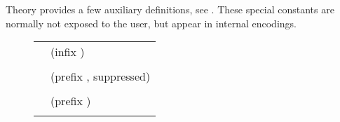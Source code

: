 \begin{isabellebody}
\begin{isamarkuptext}
\begin{description}
  \end{description}%
\end{isamarkuptext}%
\isamarkuptrue%
%
\endisatagmlantiq
{\isafoldmlantiq}%
%
\isadelimmlantiq
%
\endisadelimmlantiq
%
\isamarkuptrue%
%
\begin{isamarkuptext}%
Theory  provides a few auxiliary definitions, see
  .  These special constants are normally not
  exposed to the user, but appear in internal encodings.

  \begin{figure}[htb]
  \begin{center}
  \begin{tabular}{ll}
  \isa{conjunction\ {\isaliteral{3A}{\isacharcolon}}{\isaliteral{3A}{\isacharcolon}}\ prop\ {\isaliteral{5C3C52696768746172726F773E}{\isasymRightarrow}}\ prop\ {\isaliteral{5C3C52696768746172726F773E}{\isasymRightarrow}}\ prop} & (infix \isa{{\isaliteral{26}{\isacharampersand}}{\isaliteral{26}{\isacharampersand}}{\isaliteral{26}{\isacharampersand}}}) \\
  \isa{{\isaliteral{5C3C7475726E7374696C653E}{\isasymturnstile}}\ A\ {\isaliteral{26}{\isacharampersand}}{\isaliteral{26}{\isacharampersand}}{\isaliteral{26}{\isacharampersand}}\ B\ {\isaliteral{5C3C65717569763E}{\isasymequiv}}\ {\isaliteral{28}{\isacharparenleft}}{\isaliteral{5C3C416E643E}{\isasymAnd}}C{\isaliteral{2E}{\isachardot}}\ {\isaliteral{28}{\isacharparenleft}}A\ {\isaliteral{5C3C4C6F6E6772696768746172726F773E}{\isasymLongrightarrow}}\ B\ {\isaliteral{5C3C4C6F6E6772696768746172726F773E}{\isasymLongrightarrow}}\ C{\isaliteral{29}{\isacharparenright}}\ {\isaliteral{5C3C4C6F6E6772696768746172726F773E}{\isasymLongrightarrow}}\ C{\isaliteral{29}{\isacharparenright}}} \\[1ex]
  \isa{prop\ {\isaliteral{3A}{\isacharcolon}}{\isaliteral{3A}{\isacharcolon}}\ prop\ {\isaliteral{5C3C52696768746172726F773E}{\isasymRightarrow}}\ prop} & (prefix \isa{{\isaliteral{23}{\isacharhash}}}, suppressed) \\
  \isa{{\isaliteral{23}{\isacharhash}}A\ {\isaliteral{5C3C65717569763E}{\isasymequiv}}\ A} \\[1ex]
  \isa{term\ {\isaliteral{3A}{\isacharcolon}}{\isaliteral{3A}{\isacharcolon}}\ {\isaliteral{5C3C616C7068613E}{\isasymalpha}}\ {\isaliteral{5C3C52696768746172726F773E}{\isasymRightarrow}}\ prop} & (prefix \isa{TERM}) \\
  \isa{term\ x\ {\isaliteral{5C3C65717569763E}{\isasymequiv}}\ {\isaliteral{28}{\isacharparenleft}}{\isaliteral{5C3C416E643E}{\isasymAnd}}A{\isaliteral{2E}{\isachardot}}\ A\ {\isaliteral{5C3C4C6F6E6772696768746172726F773E}{\isasymLongrightarrow}}\ A{\isaliteral{29}{\isacharparenright}}} \\[1ex]

\end{tabular}
\end{center}
\end{figure}
\end{isamarkuptext}
\end{isabellebody}
